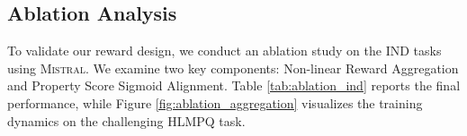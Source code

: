 \documentclass[11pt]{article}
\begin{document}
\subsection{Ablation Analysis}

To validate our reward design, we conduct an ablation study on the IND tasks using \textsc{Mistral}. We examine two key components: Non-linear Reward Aggregation and Property Score Sigmoid Alignment. Table \ref{tab:ablation_ind} reports the final performance, while Figure \ref{fig:ablation_aggregation} visualizes the training dynamics on the challenging HLMPQ task.
\end{document}
